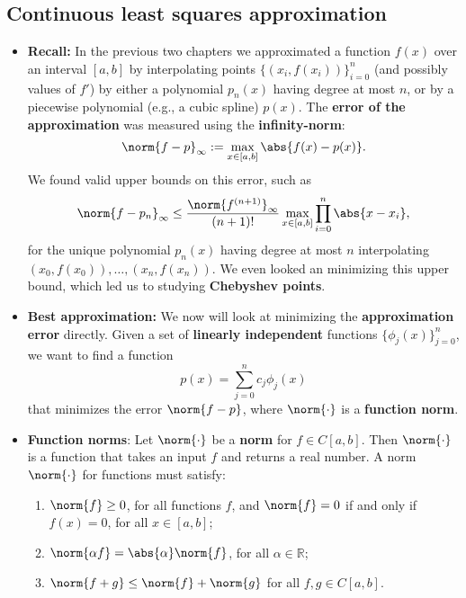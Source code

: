 \documentclass{report}
\begin{document}
     \subsection{Continuous least squares approximation}
     \begin{itemize}
         \item \textbf{Recall:} 
             In the previous two chapters we approximated a function $f(x)$ over an interval $[a,b]$ by interpolating points $\{(x_i,f(x_i))\}_{i=0}^n$ (and possibly values of $f'$) by either a polynomial $p_n(x)$ having degree at most $n$, or by a piecewise polynomial (e.g., a cubic spline) $p(x)$.
             \bigbreak \noindent 
             The \textbf{error of the approximation} was measured using the \textbf{infinity-norm}:
             $$
             \norm{f - p}_\infty := \max_{x \in [a,b]} \abs{f(x) - p(x)}.$$
             We found valid upper bounds on this error, such as 
             $$\norm{f - p_n}_\infty \leq \frac{\norm{f^{(n+1)}}_\infty}{(n+1)!} \max_{x \in [a,b]} \prod_{i=0}^n \abs{x-x_i},$$
             for the unique polynomial $p_n(x)$ having degree at most $n$ interpolating $(x_0,f(x_0)), \ldots, (x_n,f(x_n))$.
             \bigbreak \noindent 
             We even looked an minimizing this upper bound, which led us to studying \textbf{Chebyshev points}.
         \item \textbf{Best approximation:} We now will look at minimizing the \textbf{approximation error} directly. 
             Given a set of \textbf{linearly independent} functions $\{\phi_j(x)\}_{j=0}^n$, we want to find a function 
             $$p(x) = \sum_{j=0}^n c_j \phi_j(x)$$
             that minimizes the error $\norm{f - p}$, where $\norm{\cdot}$ is a \textbf{function norm}.
         \item \textbf{Function norms}:
             Let $\norm{\cdot}$ be a \textbf{norm} for $f \in C[a,b]$.
             \bigbreak \noindent 
             Then $\norm{\cdot}$ is a function that takes an input $f$ and returns a real number.
             \bigbreak \noindent 
             A norm $\norm{\cdot}$ for functions must satisfy:
             \begin{enumerate}
                 \item $\norm{f} \geq 0$, for all functions $f$, and $\norm{f} = 0$ if and only if $f(x) = 0$, for all $x \in [a,b]$;
                 \item $\norm{\alpha f} = \abs{\alpha} \norm{f}$, for all $\alpha \in \mathbb{R}$;
                 \item $\norm{f+g} \leq \norm{f} + \norm{g}$ for all $f, g \in C[a,b]$.

\end{enumerate}
\end{itemize}
\end{document}
